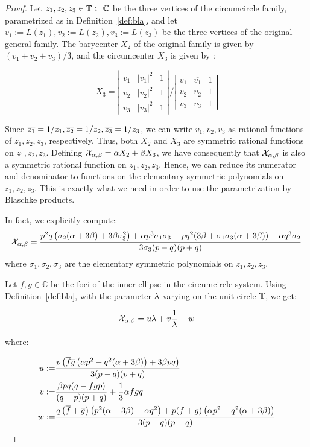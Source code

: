 \begin{proof}
Let $z_1,z_2,z_3\in\mathbb{T}\subset\mathbb{C}$ be the three vertices of the circumcircle family, parametrized as in Definition~\ref{def:bla}, and let $v_1:=L(z_1),v_2:=L(z_2),v_3:=L(z_3)$ be the three vertices of the original general family. The barycenter $X_2$ of the original family is given by $(v_1+v_2+v_3)/3$, and the circumcenter $X_3$ is given by \cite{stackexchange-x3a}:

\[
    X_3=\left|
        \begin{array}{ccc}
          v_1 & |v_1|^2 & 1 \\
          v_2 & |v_2|^2 & 1 \\
          v_3 & |v_3|^2 & 1
        \end{array}
      \right| \Bigg/
     \left|
        \begin{array}{ccc}
          v_1 & \overline{v_1} & 1 \\
          v_2 & \overline{v_2} & 1 \\
          v_3 & \overline{v_3} & 1
        \end{array}
      \right|
\]

Since $\overline{z_1}=1/z_1,\overline{z_2}=1/z_2,\overline{z_3}=1/z_3$, we can write $v_1,v_2,v_3$ as rational functions of $z_1,z_2,z_3$, respectively. Thus, both $X_2$ and $X_3$ are symmetric rational functions on $z_1,z_2,z_3$. Defining $\mathcal{X}_{\alpha,\beta}=\alpha X_2+\beta X_3$, we have consequently that $\mathcal{X}_{\alpha,\beta}$ is also a symmetric rational function on $z_1,z_2,z_3$. Hence, we can reduce its numerator and denominator to functions on the elementary symmetric polynomials on $z_1,z_2,z_3$. This is exactly what we need in order to use the parametrization by Blaschke products.

In fact, we explicitly compute:
\[  \mathcal{X}_{\alpha,\beta}= \frac{p^2 q \left(\sigma_2 (\alpha +3 \beta )+3 \beta  \sigma_3^2\right)+\alpha  p^3 \sigma_1 \sigma_3-p q^2 (3 \beta +\sigma_1 \sigma_3 (\alpha +3 \beta ))-\alpha  q^3 \sigma_2}{3 \sigma_3 (p-q) (p+q)}\]
where $\sigma_1,\sigma_2,\sigma_3$ are the elementary symmetric polynomials on $z_1,z_2,z_3$.

Let $f,g\in\mathbb{C}$ be the foci of the inner ellipse in the circumcircle system. Using Definition~\ref{def:bla}, with the parameter $\lambda$ varying on the unit circle $\mathbb{T}$, we get:

\begin{equation}
\mathcal{X}_{\alpha,\beta}= u \lambda+v\frac{1}{\lambda}+w
\label{eqn:xi-param}
\end{equation}

\noindent where:

\begin{align*}
    u:=&\frac{p \left(\overline{f} \overline{g} \left(\alpha  p^2-q^2 (\alpha +3 \beta )\right)+3 \beta  p q\right)}{3 (p-q) (p+q)}\\
    v:=&\frac{\beta  p q (q-f g p)}{(q-p) (p+q)}+\frac{1}{3} \alpha  f g q\\
    w:=&\frac{q \left(\overline{f}+\overline{g}\right) \left(p^2 (\alpha +3 \beta )-\alpha  q^2\right)+p (f+g) \left(\alpha  p^2-q^2 (\alpha +3 \beta )\right)}{3 (p-q) (p+q)}
\end{align*}


\end{proof}
